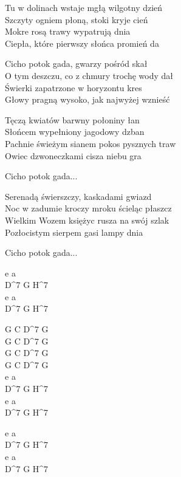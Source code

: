 \begin{text}
    Tu w dolinach wstaje mgłą wilgotny dzień\\
	Szczyty ogniem płoną, stoki kryje cień\\
	Mokre rosą trawy wypatrują dnia\\
	Ciepła, które pierwszy słońca promień da    

    \vin Cicho potok gada, gwarzy pośród skał\\
	\vin O tym deszczu, co z chmury trochę wody dał\\
	\vin Świerki zapatrzone w horyzontu kres\\
	\vin Głowy pragną wysoko, jak najwyżej wznieść
	
    Tęczą kwiatów barwny połoniny łan\\
	Słońcem wypełniony jagodowy dzban\\
	Pachnie świeżym sianem pokos pysznych traw\\
	Owiec dzwoneczkami cisza niebu gra

    \vin Cicho potok gada...

    Serenadą świerszczy, kaskadami gwiazd\\
	Noc w zadumie kroczy mroku ścieląc płaszcz\\
	Wielkim Wozem księżyc rusza na swój szlak\\
	Pozłocistym sierpem gasi lampy dnia
	
	\vin Cicho potok gada...
\end{text}
\begin{chord}
    e a\\
	D^7 G H^7\\
	e a\\
	D^7 G H^7
	
	G C D^7 G\\
	G C D^7 G\\
	G C D^7 G\\
	G C D^7 G\\
    
    e a\\
	D^7 G H^7\\
	e a\\
	D^7 G H^7\\
    \hfill\break
    
    e a\\
	D^7 G H^7\\
	e a\\
	D^7 G H^7\\
\end{chord}
